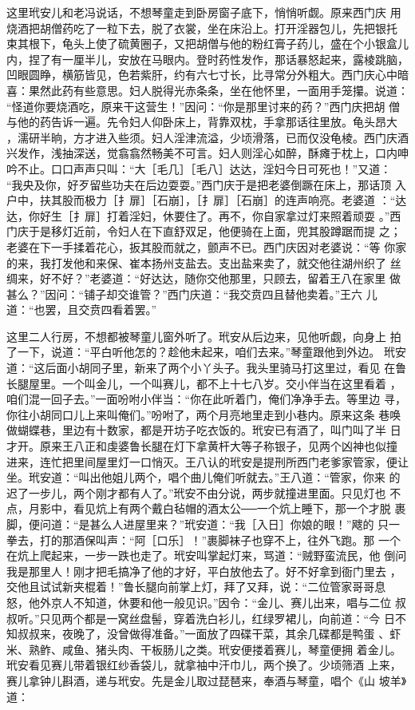 这里玳安儿和老冯说话，不想琴童走到卧房窗子底下，悄悄听觑。原来西门庆
用烧酒把胡僧药吃了一粒下去，脱了衣裳，坐在床沿上。打开淫器包儿，先把银托
束其根下，龟头上使了硫黄圈子，又把胡僧与他的粉红膏子药儿，盛在个小银盒儿
内，捏了有一厘半儿，安放在马眼内。登时药性发作，那话暴怒起来，露棱跳脑，
凹眼圆睁，横筋皆见，色若紫肝，约有六七寸长，比寻常分外粗大。西门庆心中暗
喜：果然此药有些意思。妇人脱得光赤条条，坐在他怀里，一面用手笼攥。说道：
“怪道你要烧酒吃，原来干这营生！”因问：“你是那里讨来的药？”西门庆把胡
僧与他的药告诉一遍。先令妇人仰卧床上，背靠双枕，手拿那话往里放。龟头昂大
，濡研半晌，方才进入些须。妇人淫津流溢，少顷滑落，已而仅没龟棱。西门庆酒
兴发作，浅抽深送，觉翕翕然畅美不可言。妇人则淫心如醉，酥瘫于枕上，口内呻
吟不止。口口声声只叫：“大［毛几］［毛八］达达，淫妇今日可死也！”又道：
“我央及你，好歹留些功夫在后边耍耍。”西门庆于是把老婆倒蹶在床上，那话顶
入户中，扶其股而极力［扌扉］［石崩］，［扌扉］［石崩］的连声响亮。老婆道
：“达达，你好生［扌扉］打着淫妇，休要住了。再不，你自家拿过灯来照着顽耍
。”西门庆于是移灯近前，令妇人在下直舒双足，他便骑在上面，兜其股蹲踞而提
之；老婆在下一手揉着花心，扳其股而就之，颤声不已。西门庆因对老婆说：“等
你家的来，我打发他和来保、崔本扬州支盐去。支出盐来卖了，就交他往湖州织了
丝绸来，好不好？”老婆道：“好达达，随你交他那里，只顾去，留着王八在家里
做甚么？”因问：“铺子却交谁管？”西门庆道：“我交贲四且替他卖着。”王六
儿道：“也罢，且交贲四看着罢。”

这里二人行房，不想都被琴童儿窗外听了。玳安从后边来，见他听觑，向身上
拍了一下，说道：“平白听他怎的？趁他未起来，咱们去来。”琴童跟他到外边。
玳安道：“这后面小胡同子里，新来了两个小丫头子。我头里骑马打这里过，看见
在鲁长腿屋里。一个叫金儿，一个叫赛儿，都不上十七八岁。交小伴当在这里看着
，咱们混一回子去。”一面吩咐小伴当：“你在此听着门，俺们净净手去。等里边
寻，你往小胡同口儿上来叫俺们。”吩咐了，两个月亮地里走到小巷内。原来这条
巷唤做蝴蝶巷，里边有十数家，都是开坊子吃衣饭的。玳安已有酒了，叫门叫了半
日才开。原来王八正和虔婆鲁长腿在灯下拿黄杆大等子称银子，见两个凶神也似撞
进来，连忙把里间屋里灯一口悄灭。王八认的玳安是提刑所西门老爹家管家，便让
坐。玳安道：“叫出他姐儿两个，唱个曲儿俺们听就去。”王八道：“管家，你来
的迟了一步儿，两个刚才都有人了。”玳安不由分说，两步就撞进里面。只见灯也
不点，月影中，看见炕上有两个戴白毡帽的酒太公──一个炕上睡下，那一个才脱
裹脚，便问道：“是甚么人进屋里来？”玳安道：“我［入日］你娘的眼！”飕的
只一拳去，打的那酒保叫声：“阿［口乐］！”裹脚袜子也穿不上，往外飞跑。那
一个在炕上爬起来，一步一跌也走了。玳安叫掌起灯来，骂道：“贼野蛮流民，他
倒问我是那里人！刚才把毛搞净了他的才好，平白放他去了。好不好拿到衙门里去
，交他且试试新夹棍着！”鲁长腿向前掌上灯，拜了又拜，说：“二位管家哥哥息
怒，他外京人不知道，休要和他一般见识。”因令：“金儿、赛儿出来，唱与二位
叔叔听。”只见两个都是一窝丝盘髻，穿着洗白衫儿，红绿罗裙儿，向前道：“今
日不知叔叔来，夜晚了，没曾做得准备。”一面放了四碟干菜，其余几碟都是鸭蛋
、虾米、熟鲊、咸鱼、猪头肉、干板肠儿之类。玳安便搂着赛儿，琴童便拥
着金儿。玳安看见赛儿带着银红纱香袋儿，就拿袖中汗巾儿，两个换了。少顷筛酒
上来，赛儿拿钟儿斟酒，递与玳安。先是金儿取过琵琶来，奉酒与琴童，唱个《山
坡羊》道：


